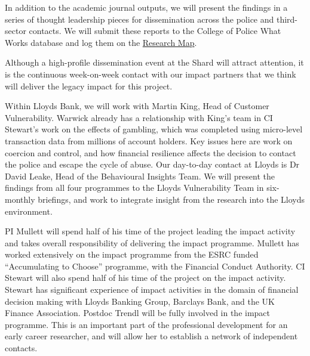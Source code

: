 \documentclass[11pt, a4paper]{article}
\newcommand{\TM}[1] {{\textcolor{orange}{#1}}}
\begin{document}
In addition to the academic journal outputs, we will present the findings in a series of thought leadership pieces for dissemination across the police and third-sector contacts. We will submit these reports to the College of Police What Works database and log them on the \href{https://whatworks.college.police.uk/Research/Research-Map/Pages/Research-Map.aspx}{Research Map}.

Although a high-profile dissemination event at the Shard will attract attention, it is the continuous week-on-week contact with our impact partners that we think will deliver the legacy impact for this project.


Within Lloyds Bank, we will work with Martin King, Head of Customer Vulnerability. Warwick already has a relationship with King's team in CI Stewart's work on the effects of gambling, which was completed using micro-level transaction data from millions of account holders. Key issues here are work on coercion and control, and how financial resilience affects the decision to contact the police and escape the cycle of abuse. Our day-to-day contact at Lloyds is Dr David Leake, Head of the Behavioural Insights Team. We will present the findings from all four programmes to the Lloyds Vulnerability Team in six-monthly briefings, and work to integrate insight from the research into the Lloyds environment. 









PI Mullett will spend half of his time of the project leading the impact activity and takes overall responsibility of delivering the impact programme. Mullett has worked extensively on the impact programme from the ESRC funded ``Accumulating to Choose'' programme, with the Financial Conduct Authority. CI Stewart will also spend half of his time of the project on the impact activity. Stewart has significant experience of impact activities in the domain of financial decision making with Lloyds Banking Group, Barclays Bank, and the UK Finance Association. Postdoc Trendl will be fully involved in the impact programme. This is an important part of the professional development for an early career researcher, and will allow her to establish a network of independent contacts. 
\end{document}
